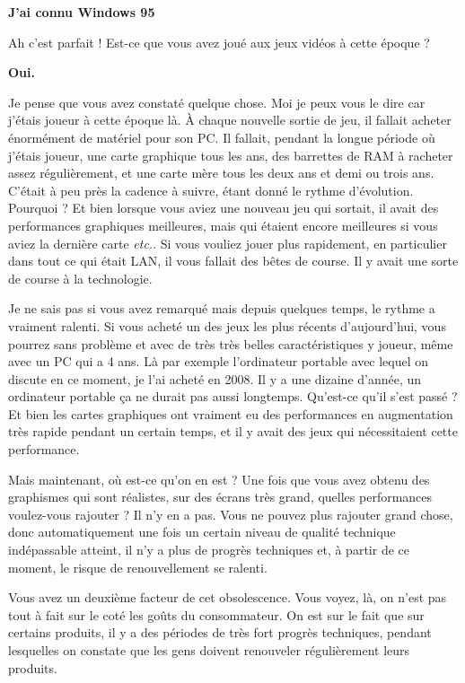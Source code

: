 \begin{small}
\smallbreak\textbf{J'ai connu Windows 95}
\smallbreak

Ah c'est parfait ! Est-ce que vous avez joué aux jeux vidéos à cette époque ? 


\smallbreak\textbf{Oui.}\smallbreak

Je pense que vous avez constaté quelque chose. Moi je peux vous le dire car j'étais joueur à cette époque là.  À chaque nouvelle sortie de jeu, il fallait acheter énormément de matériel pour son PC. Il fallait, pendant la longue période où j'étais joueur, une carte graphique tous les ans, des barrettes de RAM à racheter assez régulièrement, et une carte mère tous les deux ans et demi ou trois ans. C'était à peu près la cadence à suivre, étant donné le rythme d'évolution. Pourquoi ? Et bien lorsque vous aviez une nouveau jeu qui sortait, il avait des performances graphiques meilleures, mais qui étaient encore meilleures si vous aviez la dernière carte \textit{etc.}.  
Si vous vouliez  jouer plus rapidement, en particulier dans tout ce qui était LAN, il vous fallait des bêtes de course. Il y avait une sorte de course à la technologie. 

Je ne sais pas si vous avez remarqué mais depuis quelques temps, le rythme a vraiment ralenti. Si vous acheté un des jeux les plus récents d'aujourd'hui, vous pourrez sans problème et avec de très très belles caractéristiques y joueur, même avec un PC qui a 4 ans. 
Là par exemple l'ordinateur portable avec lequel on discute en ce moment, je l'ai acheté en 2008. Il y a une dizaine d'année, un ordinateur portable ça ne durait pas aussi longtemps. Qu'est-ce qu'il s'est passé ? Et bien les cartes graphiques ont  vraiment eu des performances en augmentation très rapide pendant un certain temps,  et il y avait des jeux qui nécessitaient cette performance.

 Mais maintenant, où est-ce qu'on en est ? Une fois que vous avez obtenu des graphismes qui sont réalistes, sur des écrans très grand, quelles performances voulez-vous rajouter ? Il n'y en a pas. Vous ne pouvez plus rajouter grand chose, donc automatiquement une fois un certain niveau de qualité technique indépassable atteint, il n'y a plus de progrès techniques et, à partir de ce moment, le risque de renouvellement se ralenti. 
 \smallbreak
 
 Vous avez un deuxième facteur de cet obsolescence. Vous voyez, là, on n'est pas tout à fait sur le coté les goûts du consommateur. On est sur le fait que sur certains produits, il y a des périodes de très fort progrès techniques, pendant lesquelles on constate que les gens doivent renouveler régulièrement leurs produits. 
 

\end{small}
